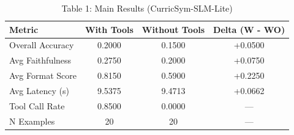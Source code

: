 \begin{table}[htbp]
  \centering
  \caption{Table 1: Main Results (CurricSym-SLM-Lite)}
  \begin{tabular}{lccc}
    \toprule
    \textbf{Metric} & \textbf{With Tools} & \textbf{Without Tools} & \textbf{Delta (W - WO)} \\
    \midrule
    Overall Accuracy & 0.2000 & 0.1500 & +0.0500 \\
    Avg Faithfulness & 0.2750 & 0.2000 & +0.0750 \\
    Avg Format Score & 0.8150 & 0.5900 & +0.2250 \\
    Avg Latency (s) & 9.5375 & 9.4713 & +0.0662 \\
    Tool Call Rate & 0.8500 & 0.0000 & --- \\
    N Examples & 20 & 20 & --- \\
    \bottomrule
  \end{tabular}
\end{table}